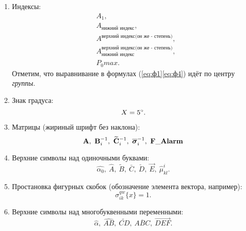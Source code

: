 \begin{enumerate}
\item Индексы:
{\zerodisplayskips
	\begin{align}
	& A_1, \label{eq:ф1}\\
	& A_{\text{нижний индекс}}, \label{eq:ф2}\\
	& A^{\text{верхний индекс(он же - степень)}}, \label{eq:ф3}\\
	& A_{\text{нижний индекс}}^{\text{верхний индекс(он же - степень)}}, \label{eq:ф4} \\
	& P_0max. \label{eq:ф55}
	\end{align}	
}%
Отметим, что выравнивание в формулах (\ref{eq:ф1}\ndash \ref{eq:ф4}) идёт по центру \textit{группы}.
\item Знак градуса:
{\zerodisplayskips
\begin{equation}
X=5\degree.
\end{equation}	
}%
\item Матрицы (жириный шрифт без наклона):
{\zerodisplayskips
\begin{equation}
	\mathbf{A},~\mathbf{B}_i^{-1},~\widetilde{\mathbf{C}}_i^{-1},~\overline{\boldsymbol{\sigma}}_i^{-1},~\mathbf{F\_Alarm}
\end{equation}	
}%
\item Верхние символы над одиночными буквами:	
{\zerodisplayskips
\begin{equation}
	\hat{\alpha_0},~\hat{A},~\tilde{B},~\bar{C},~\check{D},~\vec{E},~\hat{\mu}_{kl}^i.
\end{equation}
}%
\item Простановка фигурных скобок (обозначение элемента вектора, например):	
{\zerodisplayskips
	\begin{equation}
	\sigma_{ik}^{qw}\{ x \}=1.
	\end{equation}
}%
\item Верхние символы над многобуквенными переменными:	
{\zerodisplayskips
	\begin{equation}
	\widehat{\alpha},~\widehat{AB},~\widetilde{CD},~\overline{ABC},~\overrightarrow{DEF}.

\end{equation}}
\end{enumerate}
